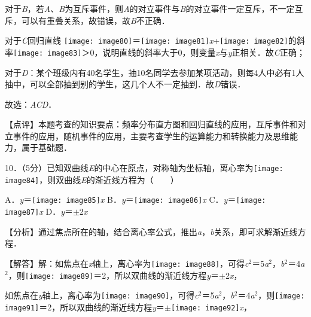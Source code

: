 \documentclass[a4paper,11pt,UTF8,twoside]{ctexart} %
\begin{document}
对于\textit{B}，若\textit{A}、\textit{B}为互斥事件，则\textit{A}的对立事件与\textit{B}的对立事件一定互斥，不一定互斥，可以有重叠关系，故错误，故\textit{B}不正确．

对于\textit{C}回归直线 \texttt{[image: image80]}＝\texttt{[image: image81]}\textit{x}+\texttt{[image: image82]}的斜率\texttt{[image: image83]}＞0，说明直线的斜率大于0，则变量\textit{x}与\textit{y}正相关．故\textit{C}正确；

对于\textit{D}：某个班级内有40名学生，抽10名同学去参加某项活动，则每4人中必有1人抽中，可以全部抽到别的学生，这几个人不一定抽到．故\textit{D}错误．

故选：\textit{ACD}．

【点评】本题考查的知识要点：频率分布直方图和回归直线的应用，互斥事件和对立事件的应用，随机事件的应用，主要考查学生的运算能力和转换能力及思维能力，属于基础题．

10．（5分）已知双曲线\textit{E}的中心在原点，对称轴为坐标轴，离心率为\texttt{[image: image84]}，则双曲线\textit{E}的渐近线方程为（　　）

A．\textit{y}＝\texttt{[image: image85]}\textit{x} B．\textit{y}＝\texttt{[image: image86]}\textit{x} C．\textit{y}＝\texttt{[image: image87]}\textit{x} D．\textit{y}＝$\mathrm{\pm}$2\textit{x}

【分析】通过焦点所在的轴，结合离心率公式，推出\textit{a}，\textit{b}关系，即可求解渐近线方程．

【解答】解：如焦点在\textit{x}轴上，离心率为\texttt{[image: image88]}，可得\textit{c}${}^{2}$＝5\textit{a}${}^{2}$，\textit{b}${}^{2}$＝4\textit{a}${}^{2}$，则\texttt{[image: image89]}＝2，所以双曲线的渐近线方程\textit{y}＝$\mathrm{\pm}$2\textit{x}，

如焦点在\textit{y}轴上，离心率为\texttt{[image: image90]}，可得\textit{c}${}^{2}$＝5\textit{a}${}^{2}$，\textit{b}${}^{2}$＝4\textit{a}${}^{2}$，则\texttt{[image: image91]}＝2，所以双曲线的渐近线方程\textit{y}＝$\mathrm{\pm}$\texttt{[image: image92]}\textit{x}，
\end{document}
